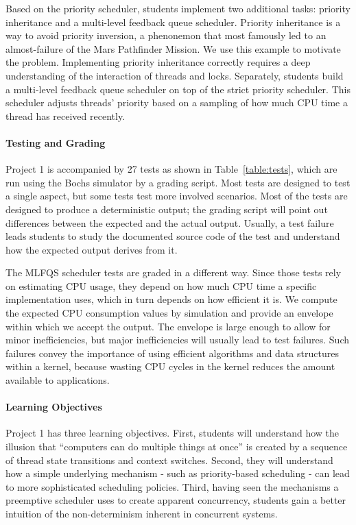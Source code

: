 Based on the priority scheduler, students implement two additional tasks: priority 
inheritance and a multi-level feedback queue scheduler.  Priority inheritance is a way
to avoid priority inversion, a phenonemon that most famously led to an almost-failure
of the Mars Pathfinder Mission.  We use this example to motivate
the problem.  Implementing priority inheritance correctly requires a deep understanding of the 
interaction of threads and locks.
Separately, students build a multi-level feedback queue scheduler on top of the strict
priority scheduler.  This scheduler adjusts threads' priority based on a sampling  of how
much CPU time a thread has received recently.

\paragraph{Testing and Grading}
Project 1 is accompanied by 27 tests as shown in Table~\ref{table:tests}, which are 
run using the Bochs simulator by a grading script.  
Most tests are designed to test a single aspect, but some tests 
test more involved scenarios.  Most of the tests are designed to produce a deterministic 
output; the grading script will point out differences between the expected and the actual output. 
Usually, a test failure leads students to study the documented source code of the test
and understand how the expected output derives from it.

The MLFQS scheduler tests are graded in a different way. Since those tests rely on estimating CPU
usage, they depend on how much CPU time a specific implementation uses, which in turn depends on how
efficient it is.  We compute the expected CPU consumption values by simulation and provide an
envelope within which we accept the output.  The envelope is large enough to allow for minor
inefficiencies, but major inefficiencies will usually lead to test failures.  Such failures
convey the importance of using efficient algorithms and data structures within a kernel,
because wasting CPU cycles in the kernel reduces the amount available to applications.

\paragraph{Learning Objectives}
Project 1 has three learning objectives.  First, students will understand how
the illusion that ``computers can do multiple things at once'' is created by a sequence
of thread state transitions and context switches.  Second, they will understand how
a simple underlying mechanism - such as priority-based scheduling - can lead to more
sophisticated scheduling policies.  Third, having seen the mechanisms a preemptive scheduler
uses to create apparent concurrency, students gain a better intuition of the non-determinism
inherent in concurrent systems. 

